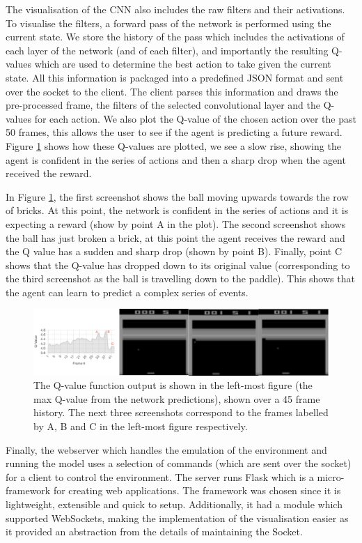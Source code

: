 The visualisation of the CNN also includes the raw filters and their activations. To visualise the filters, a forward pass of the network is performed using the current state. We store the history of the pass which includes the activations of each layer of the network (and of each filter), and importantly the resulting Q-values which are used to determine the best action to take given the current state. All this information is packaged into a predefined JSON format and sent over the socket to the client. The client parses this information and draws the pre-processed frame, the filters of the selected convolutional layer and the Q-values for each action. We also plot the Q-value of the chosen action over the past 50 frames, this allows the user to see if the agent is predicting a future reward. Figure \ref{fig:q-value-plot} shows how these Q-values are plotted, we see a slow rise, showing the agent is confident in the series of actions and then a sharp drop when the agent received the reward.

In Figure \ref{fig:q-value-plot}, the first screenshot shows the ball moving upwards towards the row of bricks. At this point, the network is confident in the series of actions and it is expecting a reward (show by point A in the plot). The second screenshot shows the ball has just broken a brick, at this point the agent receives the reward and the Q value has a sudden and sharp drop (shown by point B). Finally, point C shows that the Q-value has dropped down to its original value (corresponding to the third screenshot as the ball is travelling down to the paddle). This shows that the agent can learn to predict a complex series of events.


\begin{figure}[htbp]
	\centering
	\includegraphics[width=1\textwidth]{chapters/chapter4/images/qvalue-plot.png}
	\caption[Q-Value function visualisation]{The Q-value function output is shown in the left-most figure (the max Q-value from the network predictions), shown over a 45 frame history. The next three screenshots correspond to the frames labelled by A, B and C in the left-most figure respectively.
		\label{fig:q-value-plot}
	}
\end{figure}

Finally, the webserver which handles the emulation of the environment and running the model uses a selection of commands (which are sent over the socket) for a client to control the environment. The server runs Flask which is a micro-framework for creating web applications. The framework was chosen since it is lightweight, extensible and quick to setup. Additionally, it had a module which supported WebSockets, making the implementation of the visualisation easier as it provided an abstraction from the details of maintaining the Socket.